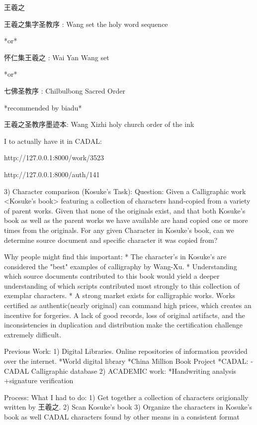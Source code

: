 王羲之

王羲之集字圣教序 : Wang set the holy word sequence

*or*

怀仁集王羲之 : Wai Yan Wang set

*or*

七佛圣教序 : Chilbulbong Sacred Order

*recommended by biadu*

王羲之圣教序墨迹本: Wang Xizhi holy church order of the ink




I to actually have it in CADAL:

http://127.0.0.1:8000/work/3523

http://127.0.0.1:8000/auth/141




3)  Character comparison (Kosuke's Task):
    Question:   Given a Calligraphic work <Kosuke's book> featuring a collection of characters hand-copied from a variety of parent works.
                Given that none of the originals exist, and that both Kosuke's book as well as the parent works we have available are hand copied one or more times from the originals.
                For any given Character in Kosuke's book, can we determine source document and specific character it was copied from?
                
Why people might find this important:
    *  The character's in Kosuke's are considered the "best" examples of calligraphy by Wang-Xu.
    *  Understanding which source documents contributed to this book would yield a deeper understanding of which scripts contributed most strongly to this collection of exemplar characters.
    *  A strong market exists for calligraphic works.  Works certified as authentic(nearly original) can command high prices, which creates an incentive for forgeries.  A lack of good records, loss of original artifacts, and the inconsistencies in duplication and distribution make the certification challenge extremely difficult.
    
Previous Work:
    1) Digital Libraries.  Online repositories of information provided over the internet.
        *World digital library
        *China Million Book Project
            *CADAL:
                -CADAL Calligraphic database
    2) ACADEMIC work:
        *Handwriting analysis
            +signature verification
            

Process:  What I had to do:
    1)  Get together a collection of characters origionally written by 王羲之.
    2)  Scan Kosuke's book
    3)  Organize the characters in Kosuke's book as well CADAL characters found by other means in a consistent format
    
